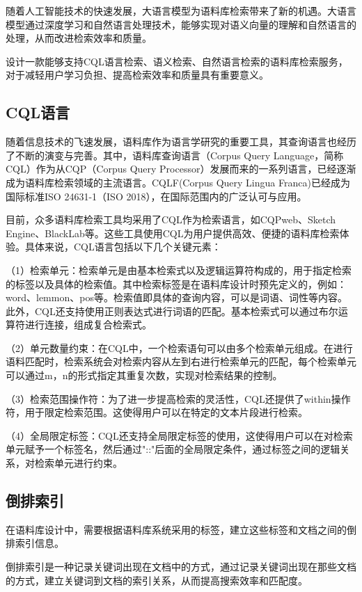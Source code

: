\documentclass[11pt]{article}
\begin{document}
\begin{CJK*}{UTF8}{gbsn}
随着人工智能技术的快速发展，大语言模型为语料库检索带来了新的机遇。大语言模型通过深度学习和自然语言处理技术，能够实现对语义向量的理解和自然语言的处理，从而改进检索效率和质量。

设计一款能够支持CQL语言检索、语义检索、自然语言检索的语料库检索服务，对于减轻用户学习负担、提高检索效率和质量具有重要意义。

\subsection{CQL语言}

随着信息技术的飞速发展，语料库作为语言学研究的重要工具，其查询语言也经历了不断的演变与完善。其中，语料库查询语言（Corpus Query Language，简称CQL）作为从CQP（Corpus Query Processor）发展而来的一系列语言，已经逐渐成为语料库检索领域的主流语言。CQLF(Corpus Query Lingua Franca)已经成为国际标准ISO 24631-1（ISO 2018），在国际范围内的广泛认可与应用。

目前，众多语料库检索工具均采用了CQL作为检索语言，如CQPweb、Sketch Engine、BlackLab等。这些工具使用CQL为用户提供高效、便捷的语料库检索体验。具体来说，CQL语言包括以下几个关键元素：

（1）检索单元：检索单元是由基本检索式以及逻辑运算符构成的，用于指定检索的标签以及具体的检索值。其中检索标签是在语料库设计时预先定义的，例如：word、lemmon、pos等。检索值即具体的查询内容，可以是词语、词性等内容。此外，CQL还支持使用正则表达式进行词语的匹配。基本检索式可以通过布尔运算符进行连接，组成复合检索式。

（2）单元数量约束：在CQL中，一个检索语句可以由多个检索单元组成。在进行语料匹配时，检索系统会对检索内容从左到右进行检索单元的匹配，每个检索单元可以通过{m，n}的形式指定其重复次数，实现对检索结果的控制。

（3）检索范围操作符：为了进一步提高检索的灵活性，CQL还提供了within操作符，用于限定检索范围。这使得用户可以在特定的文本片段进行检索。

（4）全局限定标签：CQL还支持全局限定标签的使用，这使得用户可以在对检索单元赋予一个标签名，然后通过"::"后面的全局限定条件，通过标签之间的逻辑关系，对检索单元进行约束。

\subsection{倒排索引}

在语料库设计中，需要根据语料库系统采用的标签，建立这些标签和文档之间的倒排索引信息。

倒排索引是一种记录关键词出现在文档中的方式，通过记录关键词出现在那些文档的方式，建立关键词到文档的索引关系，从而提高搜索效率和匹配度。


\end{CJK*}
\end{document}
